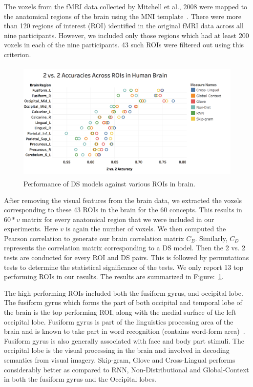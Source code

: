 The voxels from the fMRI data collected by Mitchell et al., 2008 were mapped to the anatomical regions of the brain using the MNI template~\cite{Mitchell1191}. There were more than 120 regions of interest (ROI) identified in the original fMRI data across all nine participants. However, we included only those regions which had at least 200 voxels in each of the nine participants. 43 such ROIs were filtered out using this criterion. 
\begin{figure}[!t]
\centering
\includegraphics[width=12cm, height=6cm]{Figures/temp1}
\caption{Performance of DS models against various ROIs in brain.}
\label{roi}
\end{figure}
After removing the visual features from the brain data, we extracted the voxels corresponding to these 43 ROIs in the brain for the 60 concepts. This results in $60*v$ matrix for every anatomical region that we were included in our experiments. Here $v$ is again the number of voxels. We then computed the Pearson correlation to generate our brain correlation matrix $C_B$. Similarly, $C_D$  represents the correlation matrix corresponding to a DS model. Then the 2 vs. 2 tests are conducted for every ROI and DS pairs. This is followed by permutations tests to determine the statistical significance of the tests. We only report 13 top performing ROIs in our results. The results are summarized in Figure:~\ref{roi}.

The high performing ROIs included both the fusiform gyrus, and occipital lobe. The fusiform gyrus which forms the part of both occipital and temporal lobe of the brain is the top performing ROI, along with the medial surface of the left occipital lobe. Fusiform gyrus is part of the linguistics processing area of the brain and is known to take part in word recognition (contains word-form area)~\cite{nobre1994word}. Fusiform gyrus is also generally associated with face and body part stimuli. The occipital lobe is the visual processing in the brain and involved in decoding semantics from visual imagery. Skip-gram, Glove and Cross-Lingual performs considerably better as compared to RNN, Non-Distributional and Global-Context in both the fusiform gyrus and the Occipital lobes.

